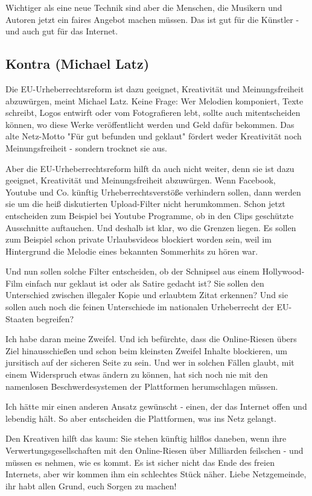 \documentclass[9pt, a4paper]{scrartcl}
\newcommand{\keineNr}[1][-1]{\addtocounter{linenumber}{#1}}
\begin{document}
\begin{zeilenNrZweispaltig}
Wichtiger als eine neue Technik sind aber die Menschen, die Musikern und Autoren jetzt ein faires Angebot machen müssen. Das ist gut für die Künstler - und auch gut für das Internet.

\subsection*{Kontra (Michael Latz)}\keineNr
Die EU-Urheberrechtsreform ist dazu geeignet, Kreativität und Meinungsfreiheit abzuwürgen, meint Michael Latz.
Keine Frage: Wer Melodien komponiert, Texte schreibt, Logos entwirft oder vom Fotografieren lebt, sollte auch mitentscheiden können, wo diese Werke veröffentlicht werden und Geld dafür bekommen. Das alte Netz-Motto "Für gut befunden und geklaut" fördert weder Kreativität noch Meinungsfreiheit - sondern trocknet sie aus.

Aber die EU-Urheberrechtsreform hilft da auch nicht weiter, denn sie ist dazu geeignet, Kreativität und Meinungsfreiheit abzuwürgen. Wenn Facebook, Youtube und Co. künftig Urheberrechtsverstöße verhindern sollen, dann werden sie um die heiß diskutierten Upload-Filter nicht herumkommen. Schon jetzt entscheiden zum Beispiel bei Youtube Programme, ob in den Clips geschützte Ausschnitte auftauchen. Und deshalb ist klar, wo die Grenzen liegen. Es sollen zum Beispiel schon private Urlaubsvideos blockiert worden sein, weil im Hintergrund die Melodie eines bekannten Sommerhits zu hören war.

Und nun sollen solche Filter entscheiden, ob der Schnipsel aus einem Hollywood-Film einfach nur geklaut ist oder als Satire gedacht ist? Sie sollen den Unterschied zwischen illegaler Kopie und erlaubtem Zitat erkennen? Und sie sollen auch noch die feinen Unterschiede im nationalen Urheberrecht der EU-Staaten begreifen?

Ich habe daran meine Zweifel. Und ich befürchte, dass die Online-Riesen übers Ziel hinausschießen und schon beim kleinsten Zweifel Inhalte blockieren, um jursitisch auf der sicheren Seite zu sein. Und wer in solchen Fällen glaubt, mit einem Widerspruch etwas ändern zu können, hat sich noch nie mit den namenlosen Beschwerdesystemen der Plattformen herumschlagen müssen.

Ich hätte mir einen anderen Ansatz gewünscht - einen, der das Internet offen und lebendig hält. So aber entscheiden die Plattformen, was ins Netz gelangt.

Den Kreativen hilft das kaum: Sie stehen künftig hilflos daneben, wenn ihre Verwertungsgesellschaften mit den Online-Riesen über Milliarden feilschen - und müssen es nehmen, wie es kommt. Es ist sicher nicht das Ende des freien Internets, aber wir kommen ihm ein schlechtes Stück näher. Liebe Netzgemeinde, ihr habt allen Grund, euch Sorgen zu machen!
\end{zeilenNrZweispaltig}
\end{document}
